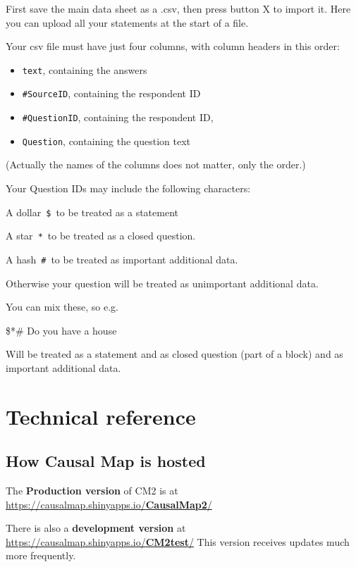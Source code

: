 \documentclass[
]{book}
\providecommand{\tightlist}{%
  \setlength{\itemsep}{0pt}\setlength{\parskip}{0pt}}
\begin{document}
First save the main data sheet as a .csv, then press button X to import it. Here you can upload all your statements at the start of a file.

Your csv file must have just four columns, with column headers in this order:

\begin{itemize}
\tightlist
\item
  \texttt{text}, containing the answers
\item
  \texttt{\#SourceID}, containing the respondent ID
\item
  \texttt{\#QuestionID}, containing the respondent ID,
\item
  \texttt{Question}, containing the question text
\end{itemize}

(Actually the names of the columns does not matter, only the order.)

Your Question IDs may include the following characters:

A dollar~\texttt{\$}~to be treated as a statement

A star~\texttt{*}~to be treated as a closed question.

A hash~\texttt{\#}~to be treated as important additional data.

Otherwise your question will be treated as unimportant additional data.

You can mix these, so e.g.

\$*\# Do you have a house

Will be treated as a statement and as closed question (part of a block) and as important additional data.

\hypertarget{part-technical-reference}{%
\part{Technical reference}\label{part-technical-reference}}

\hypertarget{how-causal-map-is-hosted}{%
\chapter{How Causal Map is hosted}\label{how-causal-map-is-hosted}}

The \textbf{Production version} of CM2 is at \href{https://causalmap.shinyapps.io/CausalMap2/}{https://causalmap.shinyapps.io/\textbf{CausalMap2}/}

There is also a \textbf{development version} at \href{https://causalmap.shinyapps.io/CM2test/}{https://causalmap.shinyapps.io/\textbf{CM2test}/} This version receives updates much more frequently.
\end{document}

